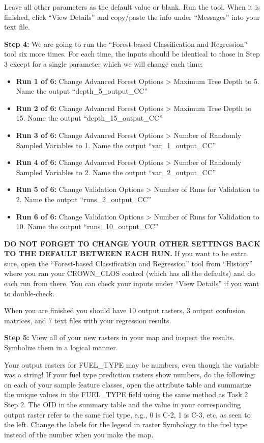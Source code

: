 \documentclass[
]{book}
\providecommand{\tightlist}{%
  \setlength{\itemsep}{0pt}\setlength{\parskip}{0pt}}
\begin{document}
Leave all other parameters as the default value or blank. Run the tool. When it is finished, click ``View Details'' and copy/paste the info under ``Messages'' into your text file.

\textbf{Step 4:} We are going to run the ``Forest-based Classification and Regression'' tool six more times. For each time, the inputs should be identical to those in Step 3 except for a single parameter which we will change each time:

\begin{itemize}
\tightlist
\item
  \textbf{Run 1 of 6:} Change Advanced Forest Options \textgreater{} Maximum Tree Depth to 5. Name the output ``depth\_5\_output\_CC''
\item
  \textbf{Run 2 of 6:} Change Advanced Forest Options \textgreater{} Maximum Tree Depth to 15. Name the output ``depth\_15\_output\_CC''
\item
  \textbf{Run 3 of 6:} Change Advanced Forest Options \textgreater{} Number of Randomly Sampled Variables to 1. Name the output ``var\_1\_output\_CC''
\item
  \textbf{Run 4 of 6:} Change Advanced Forest Options \textgreater{} Number of Randomly Sampled Variables to 2. Name the output ``var\_2\_output\_CC''
\item
  \textbf{Run 5 of 6:} Change Validation Options \textgreater{} Number of Runs for Validation to 2. Name the output ``runs\_2\_output\_CC''
\item
  \textbf{Run 6 of 6:} Change Validation Options \textgreater{} Number of Runs for Validation to 10. Name the output ``runs\_10\_output\_CC''
\end{itemize}

\textbf{DO NOT FORGET TO CHANGE YOUR OTHER SETTINGS BACK TO THE DEFAULT BETWEEN EACH RUN.} If you want to be extra sure, open the ``Forest-based Classification and Regression'' tool from ``History'' where you ran your CROWN\_CLOS control (which has all the defaults) and do each run from there. You can check your inputs under ``View Details'' if you want to double-check.

When you are finished you should have 10 output rasters, 3 output confusion matrices, and 7 text files with your regression results.

\textbf{Step 5:} View all of your new rasters in your map and inspect the results. Symbolize them in a logical manner.

Your output rasters for FUEL\_TYPE may be numbers, even though the variable was a string! If your fuel type prediction rasters show numbers, do the following: on each of your sample feature classes, open the attribute table and summarize the unique values in the FUEL\_TYPE field using the same method as Task 2 Step 2. The OID in the summary table and the value in your corresponding output raster refer to the same fuel type, e.g., 0 is C-2, 1 is C-3, etc, as seen to the left. Change the labels for the legend in raster Symbology to the fuel type instead of the number when you make the map.
\end{document}
